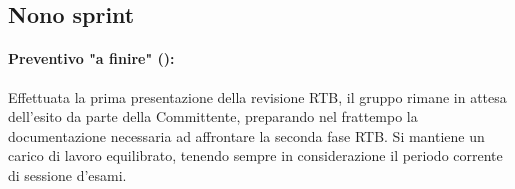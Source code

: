 \subsection{Nono sprint}

\paragraph*{Preventivo "a finire" ():}
\par Effettuata la prima presentazione della revisione RTB, il gruppo rimane in attesa dell'esito da parte della Committente, preparando nel frattempo la documentazione necessaria ad affrontare la seconda fase RTB. Si mantiene un carico di lavoro equilibrato, tenendo sempre in considerazione il periodo corrente di sessione d'esami.